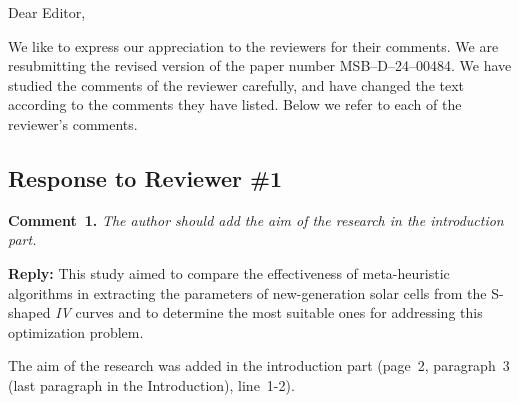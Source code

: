 \documentclass{WileyMSP-template}
\begin{document}
Dear Editor,

We like to express our appreciation to the reviewers for their comments.
We are resubmitting the revised version of the paper number MSB--D--24--00484.
We have studied the comments of the reviewer carefully, and have changed the text according to the comments they
have listed.
Below we refer to each of the reviewer’s comments.


\subsection*{Response to Reviewer \#1 }

\noindent
\textcolor[rgb]{0.00,0.50,1.00}{\textbf{Comment~1.}}
\emph{The author should add the aim of the research in the introduction part.}

\noindent
\textcolor[rgb]{0.51,0.00,0.00}{\textbf{Reply:}}
This study aimed to compare the effectiveness of meta-heuristic algorithms in extracting
the parameters of new-generation solar cells from the S-shaped \emph{IV} curves
and to determine the most suitable ones for addressing this optimization problem.

The aim of the research was added in the introduction part
(page~2, paragraph~3 (last paragraph in the Introduction), line~1-2).
\end{document}
